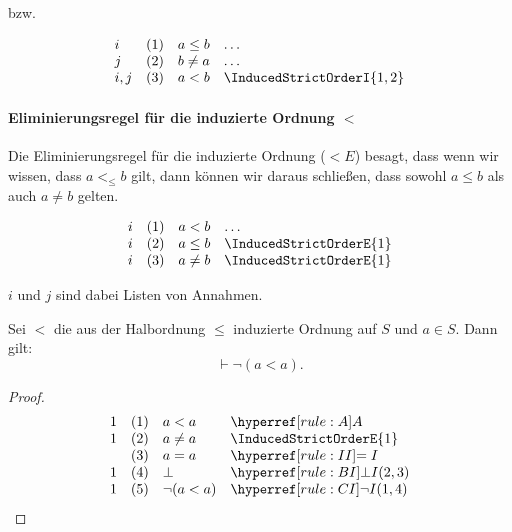\documentclass[main.tex]{subfiles}
\begin{document}
bzw.

\[
\begin{array}{llll}
    i   & (1) & a \leq b & \dots \\
    j   & (2) & b \neq a & \dots \\
    i,j & (3) & a < b & \InducedStrictOrderI{1,2}
\end{array}
\]

\paragraph{Eliminierungsregel für die induzierte Ordnung \(<\)}
Die Eliminierungsregel für die induzierte Ordnung (\(< E\)) besagt, dass wenn wir wissen, dass \(a <_{\leq} b\) gilt, dann können wir daraus schließen, dass sowohl \(a \leq b\) als auch \(a \neq b\) gelten.

\[
\begin{array}{llll}
    i & (1) & a < b & \dots \\
    i & (2) & a \leq b & \InducedStrictOrderE{1} \\
    i & (3) & a \neq b & \InducedStrictOrderE{1}
\end{array}
\]

\(i\) und \(j\) sind dabei Listen von Annahmen.

\label{InducedStrictOrderImpnLpaLneqaRp}
\begin{theorem}
    Sei \(<\) die aus der Halbordnung \(\leq\) induzierte Ordnung auf \(S\) und \(a\in S\). Dann gilt:
    \[
    \vdash \neg (a < a).
    \]
\end{theorem}
\begin{proof}
	\[
	\begin{array}{llll}
		1   & (1) & a<a & \rA\\
		1   & (2) & a\neq a & \InducedStrictOrderE{1}\\
		  & (3) & a=a & \rII{}\\
        1   & (4) & \bot & \rBI{2,3}\\
        1   & (5) & \neg(a<a) & \rCI{1,4}\\
	\end{array}
	\]    
\end{proof}
\end{document}
